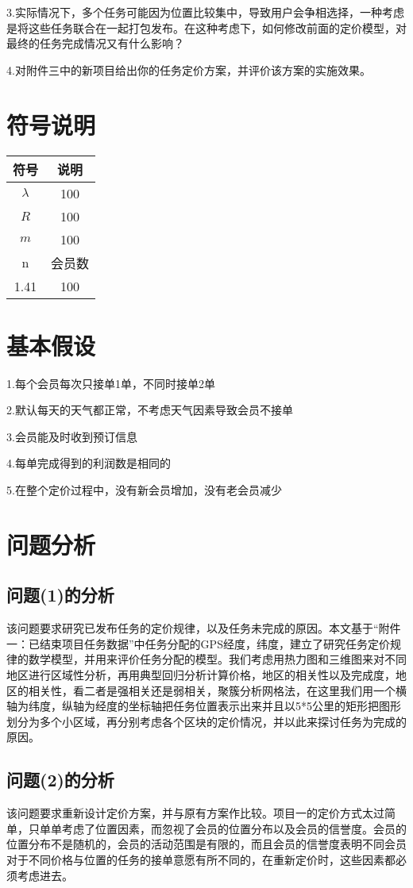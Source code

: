 \documentclass{ctexart}
\begin{document}
3.实际情况下，多个任务可能因为位置比较集中，导致用户会争相选择，一种考虑是将这些任务联合在一起打包发布。在这种考虑下，如何修改前面的定价模型，对最终的任务完成情况又有什么影响？

4.对附件三中的新项目给出你的任务定价方案，并评价该方案的实施效果。
\section{符号说明}
\begin{table}[htbp]\large
\centering
\begin{tabular}{|c|c|}
\hline
符号&说明\\
\hline
$\lambda$ &100\\
\hline
$R$&100\\
\hline
$m$&100\\
\hline
n&会员数\\
\hline
1.41&100\\
\hline
\end{tabular}
\end{table}
\section{基本假设}
1.每个会员每次只接单1单，不同时接单2单

2.默认每天的天气都正常，不考虑天气因素导致会员不接单

3.会员能及时收到预订信息

4.每单完成得到的利润数是相同的

5.在整个定价过程中，没有新会员增加，没有老会员减少
\section{问题分析}
\subsection{问题(1)的分析}
该问题要求研究已发布任务的定价规律，以及任务未完成的原因。本文基于“附件一：已结束项目任务数据”中任务分配的GPS经度，纬度，建立了研究任务定价规律的数学模型，并用来评价任务分配的模型。我们考虑用热力图和三维图来对不同地区进行区域性分析，再用典型回归分析计算价格，地区的相关性以及完成度，地区的相关性，看二者是强相关还是弱相关，聚簇分析网格法，在这里我们用一个横轴为纬度，纵轴为经度的坐标轴把任务位置表示出来并且以5*5公里的矩形把图形划分为多个小区域，再分别考虑各个区块的定价情况，并以此来探讨任务为完成的原因。
\subsection{问题(2)的分析}
该问题要求重新设计定价方案，并与原有方案作比较。项目一的定价方式太过简单，只单单考虑了位置因素，而忽视了会员的位置分布以及会员的信誉度。会员的位置分布不是随机的，会员的活动范围是有限的，而且会员的信誉度表明不同会员对于不同价格与位置的任务的接单意愿有所不同的，在重新定价时，这些因素都必须考虑进去。
\end{document}
